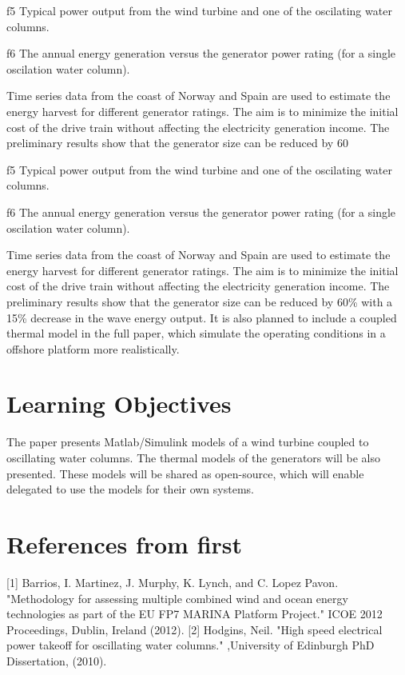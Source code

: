 \documentclass[twocolumn]{article}
\begin{document}
{f5} Typical power output from the wind turbine and one of the oscilating water columns.

{f6} The annual energy generation versus the generator power rating (for a single oscilation water column).

Time series data from the coast of Norway and Spain are used to estimate the energy harvest for different generator ratings. The aim is to minimize the initial cost of the drive train without affecting the electricity generation income. The preliminary results show that the generator size can be reduced by 60%

{f5} Typical power output from the wind turbine and one of the oscilating water columns.

{f6} The annual energy generation versus the generator power rating (for a single oscilation water column).

Time series data from the coast of Norway and Spain are used to estimate the energy harvest for different generator ratings. The aim is to minimize the initial cost of the drive train without affecting the electricity generation income. The preliminary results show that the generator size can be reduced by 60\% with a 15\% decrease in the wave energy output. It is also planned to include a coupled thermal model in the full paper, which simulate the operating conditions in a offshore platform more realistically.


\section{Learning Objectives} %
\label{sec:learning_objectives}

The paper presents Matlab/Simulink models of a wind turbine coupled to oscillating water columns. The thermal models of the generators will be also presented. These models will be shared as open-source, which will enable delegated to use the models for their own systems.


\section{References from first} %
\label{sec:references_from_first}
[1] Barrios, I. Martinez, J. Murphy, K. Lynch, and C. Lopez Pavon. "Methodology for assessing multiple combined wind and ocean energy technologies as part of the EU FP7 MARINA Platform Project." ICOE 2012 Proceedings, Dublin, Ireland (2012).
[2] Hodgins, Neil. "High speed electrical power takeoff for oscillating water columns." ,University of Edinburgh PhD Dissertation, (2010).
\end{document}
